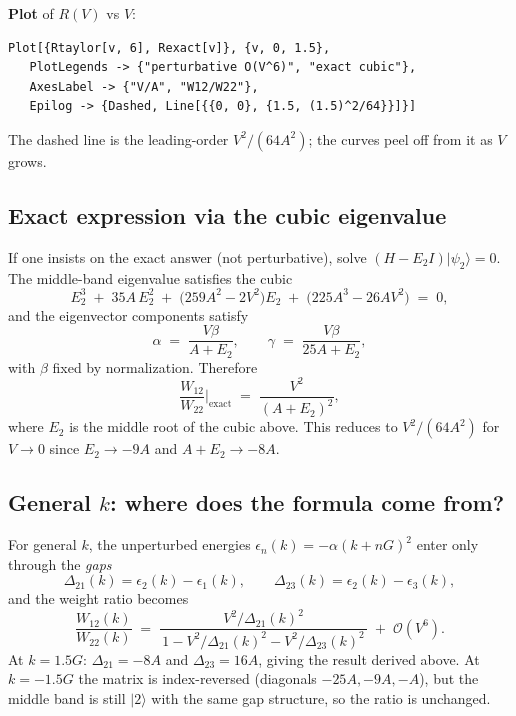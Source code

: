 \documentclass[11pt]{article}
\begin{document}
\textbf{Plot} of $R(V)$ vs $V$:
\begin{verbatim}
Plot[{Rtaylor[v, 6], Rexact[v]}, {v, 0, 1.5},
   PlotLegends -> {"perturbative O(V^6)", "exact cubic"},
   AxesLabel -> {"V/A", "W12/W22"},
   Epilog -> {Dashed, Line[{{0, 0}, {1.5, (1.5)^2/64}}]}]
\end{verbatim}
The dashed line is the leading-order $V^2/(64 A^2)$; the curves peel off from it as $V$ grows.

\subsection{Exact expression via the cubic eigenvalue}

If one insists on the exact answer (not perturbative), solve $(H - E_2 I)|\psi_2\rangle = 0$. The middle-band eigenvalue satisfies the cubic
\begin{equation}
E_2^3 \;+\; 35 A\, E_2^2 \;+\; \bigl(259 A^2 - 2 V^2\bigr) E_2 \;+\; \bigl(225 A^3 - 26 A V^2\bigr) \;=\; 0,
\end{equation}
and the eigenvector components satisfy
\begin{equation}
\alpha \;=\; \frac{V\beta}{A + E_2}, \qquad \gamma \;=\; \frac{V\beta}{25 A + E_2},
\end{equation}
with $\beta$ fixed by normalization. Therefore
\begin{equation}
\frac{W_{12}}{W_{22}}\bigg|_{\text{exact}} \;=\; \frac{V^2}{(A + E_2)^2}, \label{eq:ratio-exact}
\end{equation}
where $E_2$ is the middle root of the cubic above. This reduces to $V^2/(64 A^2)$ for $V \to 0$ since $E_2 \to -9A$ and $A + E_2 \to -8A$.

\subsection{General $k$: where does the formula come from?}

For general $k$, the unperturbed energies $\epsilon_n(k) = -\alpha(k + nG)^2$ enter only through the \emph{gaps}
\begin{equation}
\Delta_{21}(k) = \epsilon_2(k) - \epsilon_1(k), \qquad \Delta_{23}(k) = \epsilon_2(k) - \epsilon_3(k),
\end{equation}
and the weight ratio becomes
\begin{equation}
\frac{W_{12}(k)}{W_{22}(k)} \;=\; \frac{V^2 / \Delta_{21}(k)^2}{\,1 - V^2/\Delta_{21}(k)^2 - V^2/\Delta_{23}(k)^2\,} \;+\; \mathcal O(V^6).
\end{equation}
At $k = 1.5G$: $\Delta_{21} = -8A$ and $\Delta_{23} = 16A$, giving the result derived above. At $k = -1.5G$ the matrix is index-reversed (diagonals $-25A, -9A, -A$), but the middle band is still $|2\rangle$ with the same gap structure, so the ratio is unchanged.
\end{document}
